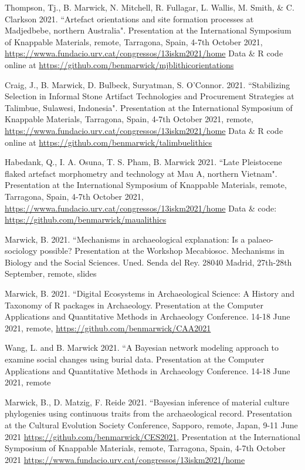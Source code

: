 \ind Thompson, Tj., B. Marwick, N. Mitchell, R. Fullagar, L. Wallis, M. Smith, \& C. Clarkson 2021. ``Artefact orientations and site formation processes at Madjedbebe, northern Australia". Presentation at the International Symposium of Knappable Materials, remote, Tarragona, Spain, 4-7th October 2021,  \url{https://wwwa.fundacio.urv.cat/congressos/13iskm2021/home}  Data \& R code online at  \url{https://github.com/benmarwick/mjblithicorientations}  

\ind Craig, J., B. Marwick, D. Bulbeck, Suryatman, S. O’Connor. 2021. ``Stabilizing Selection in Informal Stone Artifact Technologies and Procurement Strategies at Talimbue, Sulawesi, Indonesia". Presentation at the International Symposium of Knappable Materials, Tarragona, Spain, 4-7th October 2021, remote,  \url{https://wwwa.fundacio.urv.cat/congressos/13iskm2021/home}  Data \& R code online at   \url{https://github.com/benmarwick/talimbuelithics}     

\ind Habedank, Q., I. A. Osuna, T. S. Pham, B. Marwick 2021. ``Late Pleistocene flaked artefact morphometry and technology at Mau A, northern Vietnam". Presentation at the International Symposium of Knappable Materials, remote, Tarragona, Spain, 4-7th October 2021,  \url{https://wwwa.fundacio.urv.cat/congressos/13iskm2021/home} Data \& code:  \url{https://github.com/benmarwick/maualithics} 

\ind Marwick, B. 2021. ``Mechanisms in archaeological explanation: Is a palaeo-sociology possible?  Presentation at the Workshop Mecabiosoc. Mechanisms in Biology and the Social Sciences. Uned. Senda del Rey. 28040 Madrid, 27th-28th September, remote, slides  

\ind Marwick, B. 2021. ``Digital Ecosystems in Archaeological Science: A History and Taxonomy of R packages in Archaeology. Presentation at the Computer Applications and Quantitative Methods in Archaeology Conference. 14-18 June 2021, remote,  \url{https://github.com/benmarwick/CAA2021}  

\ind Wang, L. and B. Marwick 2021. ``A Bayesian network modeling approach to examine social changes using burial data. Presentation at the Computer Applications and Quantitative Methods in Archaeology Conference. 14-18 June 2021, remote 

\ind Marwick, B., D. Matzig, F. Reide 2021. ``Bayesian inference of material culture phylogenies using continuous traits from the archaeological record.  Presentation at the Cultural Evolution Society Conference, Sapporo, remote, Japan, 9-11 June 2021  \url{https://github.com/benmarwick/CES2021}, Presentation at the International Symposium of Knappable Materials, remote, Tarragona, Spain, 4-7th October 2021  \url{https://wwwa.fundacio.urv.cat/congressos/13iskm2021/home}  

